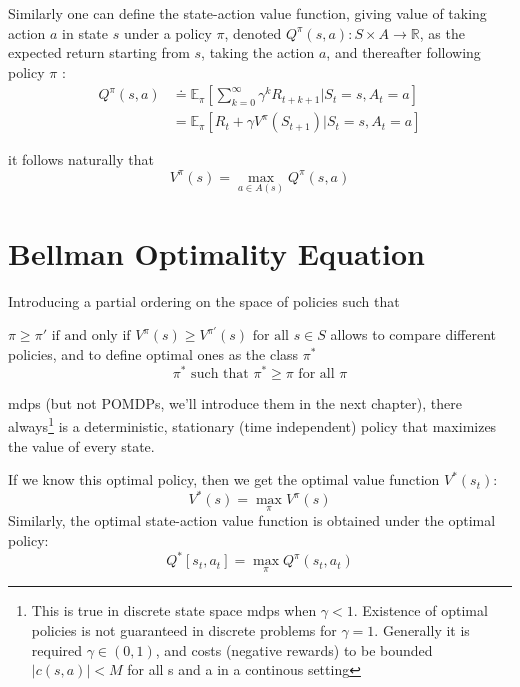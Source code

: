 \documentclass[a4paper,11pt]{report}
\theoremstyle{definition}
\theoremstyle{plain}
\theoremstyle{remark}  %
\begin{document}
Similarly one can define the state-action value function, giving value of taking action \(a\) in 
state \(s\) under a policy \(\pi\), denoted
$Q^{\pi}(s, a): S \times A \rightarrow \mathbb{R}$, as the expected return starting from \(s\), taking the action \(a\), and thereafter
 following policy \(\pi\) :
\begin{align}
    Q^{\pi}(s, a) &\doteq \mathbb{E}_{\pi}\left[\sum_{k=0}^{\infty} \gamma^{k} R_{t+k+1} | S_{t}=s, A_{t}=a\right] \nonumber  \\
    &= \mathbb{E}_{\pi}\left[R_t + \gamma V^{\pi}(S_{t+1})| S_{t}=s, A_{t}=a\right] 
\end{align}


it follows naturally that 
\[
    V^{\pi}(s)= \max _{a \in A(s)} Q^{\pi}(s, a)
\]

\section{Bellman Optimality Equation}

Introducing a partial ordering on the space of policies such that 

$\pi \geq \pi' \text{ if and only if } V^{\pi}(s) \geq V^{\pi'}(s) \text{ for all } s \in S$
allows to compare different policies, and to define optimal ones as the class $\pi^*$ 
$$\pi^* \text{ such that } \pi^* \geq \pi \text{ for all } \pi$$


\gls{mdp}s (but not POMDPs, we'll introduce them in the next chapter), there always\footnote{This 
is true in discrete state space \gls{mdp}s when $\gamma < 1$. 
Existence of optimal policies is not guaranteed in discrete problems for $\gamma = 1$. Generally 
it is required $\gamma \in (0,1)$, and costs (negative rewards) to be bounded $|c(s,a)|<M$ for all s and a in a continous setting}
 is a 
deterministic, stationary (time independent) policy that maximizes the value of every state. \cite{96ef8573-56cc-3a43-a4c7-3c6543c30f4e}
    
If we know this optimal policy, then we get the optimal value function $V^{*}(s_{t})$:
\[
V^{*}(s)=\max _{\pi}V^{\pi}(s)
\]
 Similarly, the optimal state-action value function is obtained under the optimal policy:
$$
Q^{*}\left[s_{t}, a_{t}\right]=\max _{\pi} Q^{\pi}\left(s_{t}, a_{t}\right)
$$
\end{document}
